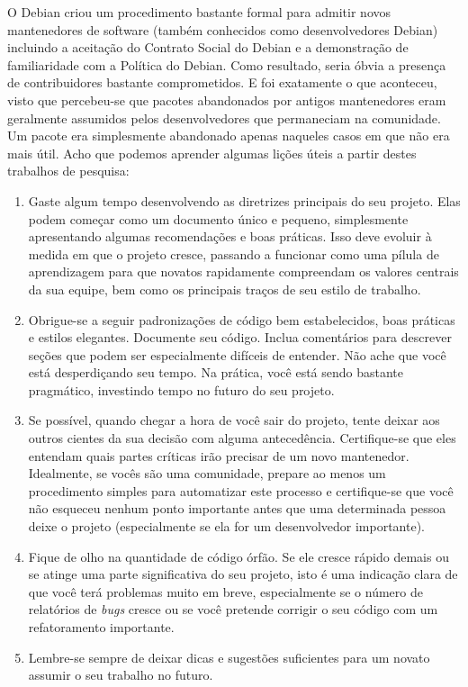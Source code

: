 O Debian criou um procedimento bastante formal para admitir novos mantenedores de
software (também conhecidos como desenvolvedores Debian) incluindo a aceitação do
Contrato Social do Debian e a demonstração de familiaridade com a Política do Debian.
Como resultado, seria óbvia a presença de contribuidores bastante comprometidos. E foi 
exatamente o que aconteceu, visto que percebeu-se que pacotes abandonados por antigos
mantenedores eram geralmente assumidos pelos desenvolvedores que permaneciam na
comunidade. Um pacote era simplesmente abandonado apenas naqueles casos em que não era mais útil.
Acho que podemos aprender algumas lições úteis a partir destes trabalhos de pesquisa:
\begin{enumerate}
 \item Gaste algum tempo desenvolvendo as diretrizes principais do seu projeto. Elas
 podem começar como um documento único e pequeno, simplesmente apresentando algumas
 recomendações e boas práticas. Isso deve evoluir à medida em que o projeto cresce,
 passando a funcionar como uma pílula de aprendizagem para que novatos rapidamente compreendam 
 os valores centrais da sua equipe, bem como os principais traços de seu estilo de trabalho.
 \item Obrigue-se a seguir padronizações de código bem estabelecidos, boas práticas e
estilos elegantes. Documente seu código. Inclua comentários para descrever seções que
podem ser especialmente difíceis de entender. Não ache que você está desperdiçando
seu tempo. Na prática, você está sendo bastante pragmático, investindo tempo no futuro
do seu projeto.
 \item Se possível, quando chegar a hora de você sair do projeto, tente deixar aos
 outros cientes da sua decisão com alguma antecedência. Certifique-se que eles entendam
 quais partes críticas irão precisar de um novo mantenedor. Idealmente, se vocês são 
 uma comunidade, prepare ao menos um procedimento simples para automatizar
 este processo e certifique-se que você não esqueceu nenhum ponto importante
 antes que uma determinada pessoa deixe o projeto (especialmente se ela for um desenvolvedor importante).
 \item Fique de olho na quantidade de código órfão. Se ele cresce rápido demais ou se
 atinge uma parte significativa do seu projeto, isto é uma indicação clara de que você terá
 problemas muito em breve, especialmente se o número de relatórios de \textit{bugs} cresce ou
 se você pretende corrigir o seu código com um refatoramento importante.
 \item Lembre-se sempre de deixar dicas e sugestões suficientes para um novato
 assumir o seu trabalho no futuro.
\end{enumerate}

